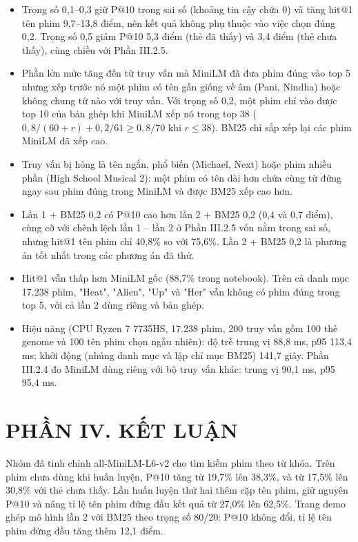 \documentclass[12pt,a4paper]{article}
\providecommand{\tightlist}{\setlength{\itemsep}{0pt}\setlength{\parskip}{0pt}}
\newcommand{\chap}[1]{\clearpage\section{#1}}
\begin{document}
\begin{itemize}
\tightlist
\item Trọng số 0,1--0,3 giữ P@10 trong sai số (khoảng tin cậy chứa 0) và tăng hit@1 tên phim 9,7--13,8 điểm, nên kết quả không phụ thuộc vào việc chọn đúng 0,2. Trọng số 0,5 giảm P@10 5,3 điểm (thẻ đã thấy) và 3,4 điểm (thẻ chưa thấy), cùng chiều với Phần III.2.5.
\item Phần lớn mức tăng đến từ truy vấn mà MiniLM đã đưa phim đúng vào top 5 nhưng xếp trước nó một phim có tên gần giống về âm (Pani, Nindha) hoặc không chung từ nào với truy vấn. Với trọng số 0,2, một phim chỉ vào được top 10 của bản ghép khi MiniLM xếp nó trong top 38 ($0{,}8/(60+r) + 0{,}2/61 \geq 0{,}8/70$ khi $r \leq 38$). BM25 chỉ sắp xếp lại các phim MiniLM đã xếp cao.
\item Truy vấn bị hỏng là tên ngắn, phổ biến (Michael, Next) hoặc phim nhiều phần (High School Musical 2): một phim có tên dài hơn chứa cùng từ đứng ngay sau phim đúng trong MiniLM và được BM25 xếp cao hơn.
\item Lần 1 + BM25 0,2 có P@10 cao hơn lần 2 + BM25 0,2 (0,4 và 0,7 điểm), cùng cỡ với chênh lệch lần 1 -- lần 2 ở Phần III.2.5 vốn nằm trong sai số, nhưng hit@1 tên phim chỉ 40,8\% so với 75,6\%. Lần 2 + BM25 0,2 là phương án tốt nhất trong các phương án đã thử.
\item Hit@1 vẫn thấp hơn MiniLM gốc (88,7\% trong notebook). Trên cả danh mục 17.238 phim, "Heat", "Alien", "Up" và "Her" vẫn không có phim đúng trong top 5, với cả lần 2 dùng riêng và bản ghép.
\item Hiệu năng (CPU Ryzen 7 7735HS, 17.238 phim, 200 truy vấn gồm 100 thẻ genome và 100 tên phim chọn ngẫu nhiên): độ trễ trung vị 88,8 ms, p95 113,4 ms; khởi động (nhúng danh mục và lập chỉ mục BM25) 141,7 giây. Phần III.2.4 đo MiniLM dùng riêng với bộ truy vấn khác: trung vị 90,1 ms, p95 95,4 ms.
\end{itemize}

\chap{PHẦN IV. KẾT LUẬN}

Nhóm đã tinh chỉnh all-MiniLM-L6-v2 cho tìm kiếm phim theo từ khóa. Trên phim chưa dùng khi huấn luyện, P@10 tăng từ 19,7\% lên 38,3\%, và từ 17,5\% lên 30,8\% với thẻ chưa thấy. Lần huấn luyện thứ hai thêm cặp tên phim, giữ nguyên P@10 và nâng tỉ lệ tên phim đứng đầu kết quả từ 27,0\% lên 62,5\%. Trang demo ghép mô hình lần 2 với BM25 theo trọng số 80/20: P@10 không đổi, tỉ lệ tên phim đứng đầu tăng thêm 12,1 điểm.
\end{document}
